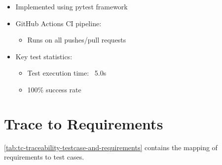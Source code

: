\documentclass[12pt, titlepage]{article}
\begin{document}
\begin{itemize}
\item Implemented using pytest framework
\item GitHub Actions CI pipeline:
  \begin{itemize}
  \item Runs on all pushes/pull requests
  \end{itemize}
\item Key test statistics:
  \begin{itemize}
  \item Test execution time: ~5.0s
  \item 100\% success rate
  \end{itemize}
\end{itemize}

\newpage

\section{Trace to Requirements}

\autoref{tab:tc-traceability-testcase-and-requirements} contains the mapping of requirements to test cases.
\end{document}
